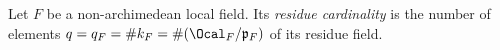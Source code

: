 Let $F$ be a non-archimedean local field. Its \emph{residue cardinality} is the number of elements
$q=q_F=\#k_F=\#(\Ocal_F/\mathfrak{p}_F)$ of its residue field.
